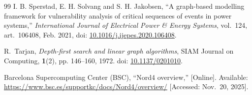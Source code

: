 \documentclass[journal]{IEEEtran}
\begin{document}
\begin{thebibliography}{99}
I. B. Sperstad, E. H. Solvang and S. H. Jakobsen,
“A graph-based modelling framework for vulnerability analysis of critical sequences of events in power systems,”
\emph{International Journal of Electrical Power \& Energy Systems}, 
vol.~124, art.~106408, Feb. 2021,
doi: \href{https://doi.org/10.1016/j.ijepes.2020.106408}{10.1016/j.ijepes.2020.106408}.

R.~Tarjan,
\emph{Depth-first search and linear graph algorithms},
SIAM Journal on Computing, \textbf{1}(2), pp. 146--160, 1972.
doi: \href{https://doi.org/10.1137/0201010}{10.1137/0201010}.

Barcelona Supercomputing Center (BSC),
``Nord4 overview,''
[Online]. Available: \url{https://www.bsc.es/supportkc/docs/Nord4/overview/}
[Accessed: Nov.~20, 2025].




\end{thebibliography}
\vfill
\end{document}
